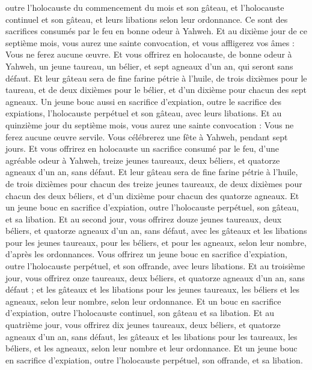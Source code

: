 \begin{multicols}{2}
outre l’holocauste du commencement du mois et son gâteau, et l’holocauste continuel et son gâteau, et leurs libations selon leur ordonnance. Ce sont des sacrifices consumés par le feu en bonne odeur à Yahweh.
Et au dixième jour de ce septième mois, vous aurez une sainte convocation, et vous affligerez vos âmes : Vous ne ferez aucune œuvre.
Et vous offrirez en holocauste, de bonne odeur à Yahweh, un jeune taureau, un bélier, et sept agneaux d'un an, qui seront sans défaut.
Et leur gâteau sera de fine farine pétrie à l'huile, de trois dixièmes pour le taureau, et de deux dixièmes pour le bélier,
et d'un dixième pour chacun des sept agneaux.
Un jeune bouc aussi en sacrifice d'expiation, outre le sacrifice des expiations, l'holocauste perpétuel et son gâteau, avec leurs libations.
Et au quinzième jour du septième mois, vous aurez une sainte convocation : Vous ne ferez aucune œuvre servile. Vous célébrerez une fête à Yahweh, pendant sept jours.
Et vous offrirez en holocauste un sacrifice consumé par le feu, d'une agréable odeur à Yahweh, treize jeunes taureaux, deux béliers, et quatorze agneaux d'un an, sans défaut.
Et leur gâteau sera de fine farine pétrie à l’huile, de trois dixièmes pour chacun des treize jeunes taureaux, de deux dixièmes pour chacun des deux béliers,
et d'un dixième pour chacun des quatorze agneaux.
Et un jeune bouc en sacrifice d'expiation, outre l'holocauste perpétuel, son gâteau, et sa libation.
Et au second jour, vous offrirez douze jeunes taureaux, deux béliers, et quatorze agneaux d'un an, sans défaut,
avec les gâteaux et les libations pour les jeunes taureaux, pour les béliers, et pour les agneaux, selon leur nombre, d'après les ordonnances.
Vous offrirez un jeune bouc en sacrifice d'expiation, outre l'holocauste perpétuel, et son offrande, avec leurs libations.
Et au troisième jour, vous offrirez onze taureaux, deux béliers, et quatorze agneaux d'un an, sans défaut ;
et les gâteaux et les libations pour les jeunes taureaux, les béliers et les agneaux, selon leur nombre, selon leur ordonnance.
Et un bouc en sacrifice d'expiation, outre l'holocauste continuel, son gâteau et sa libation.
Et au quatrième jour, vous offrirez dix jeunes taureaux, deux béliers, et quatorze agneaux d'un an, sans défaut,
les gâteaux et les libations pour les taureaux, les béliers, et les agneaux, selon leur nombre et leur ordonnance.
Et un jeune bouc en sacrifice d'expiation, outre l'holocauste perpétuel, son offrande, et sa libation.

\end{multicols}
